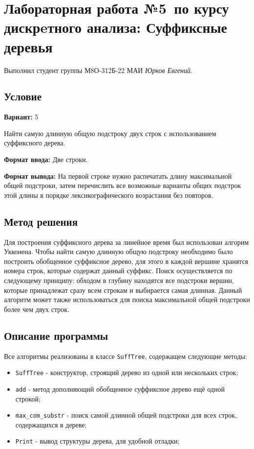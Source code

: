 \documentclass[12pt]{article}
\begin{document}
\section*{Лабораторная работа №5\, по курсу дискрeтного анализа: Суффиксные деревья}

Выполнил студент группы М8О-312Б-22 МАИ \textit{Юрков Евгений}.

\subsection*{Условие}

\textbf{Вариант:} 5

Найти самую длинную общую подстроку двух строк с использованием суффиксного дерева.

\textbf{Формат ввода:}
Две строки.

\textbf{Формат вывода:}
На первой строке нужно распечатать длину максимальной общей подстроки,
затем перечислить все возможные варианты общих подстрок этой длины
в порядке лексикографического возрастания без повторов.

\newpage
\subsection*{Метод решения}

Для построения суффиксного дерева за линейное время был использован алгорим Укконена.
Чтобы найти самую длинную общую подстроку необходимо было построить обобщенное суффиксное дерево,
для этого в каждой вершине хранятся номера строк, которые содержат данный суффикс.
Поиск осуществляется по следующему принципу: обходом в глубину находятся все подстроки вершин,
которые принадлежат сразу всем строкам и выбирается самая длинная.
Данный алгоритм может также использоваться для поиска максимальной общей подстроки 
более чем двух строк.

\subsection*{Описание программы}

Все алгоритмы реализованы в классе \texttt{SuffTree}, содержащем следующие методы:
\begin{itemize}
    \item \texttt{SuffTree} - конструктор, строящий дерево из одной или нескольких строк;
    \item \texttt{add} - метод дополняющий обобщенное суффиксное дерево ещё одной строкой;
    \item \texttt{max\_com\_substr} - поиск самой длинной общей подстроки для всех строк,
                                    содержащихся в дереве;
    \item \texttt{Print} - вывод структуры дерева, для удобной отладки;
\end{itemize}
\end{document}
